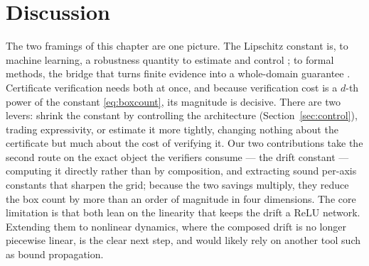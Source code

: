 \section{Discussion}

The two framings of this chapter are one picture. The Lipschitz constant is, to machine learning, a robustness quantity to estimate \cite{fazlyab2019lipsdp,bhowmick2021lipbab} and control \cite{miyato2018spectral,araujo2023unified}; to formal methods, the bridge that turns finite evidence into a whole-domain guarantee \cite{wu2020game,berkenkamp2017safe}. Certificate verification needs both at once, and because verification cost is a $d$-th power of the constant \eqref{eq:boxcount}, its magnitude is decisive. There are two levers: shrink the constant by controlling the architecture (Section~\ref{sec:control}), trading expressivity, or estimate it more tightly, changing nothing about the certificate but much about the cost of verifying it. Our two contributions take the second route on the exact object the verifiers consume --- the drift constant --- computing it directly rather than by composition, and extracting sound per-axis constants that sharpen the grid; because the two savings multiply, they reduce the box count by more than an order of magnitude in four dimensions. The core limitation is that both lean on the linearity that keeps the drift a $\mathrm{ReLU}$ network. Extending them to nonlinear dynamics, where the composed drift is no longer piecewise linear, is the clear next step, and would likely rely on another tool such as bound propagation.

\newpage
